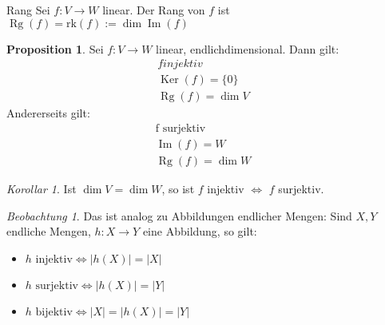 \documentclass[11pt]{article}
\DeclareMathOperator{\mdim}{dim}
\DeclareMathOperator{\mKer}{Ker}
\DeclareMathOperator{\mIm}{Im}
\DeclareMathOperator{\mRg}{Rg}
\theoremstyle{remark}
\newtheorem{beobachtung}{Beobachtung}
\theoremstyle{definition}
\newtheorem*{proposition}{Proposition}
\theoremstyle{remark}
\newtheorem*{korollar}{Korollar}
\begin{document}
\begin{definition}{Rang}{}
Sei $f:V\to W$ linear. Der Rang von \(f\) ist $\mRg(f) = \text{rk}(f) := \dim\mIm(f)$
\end{definition}

\begin{proposition} Sei \(f:V\to W\) linear, endlichdimensional.
Dann gilt:
\begin{align*}
	f injektiv &
	\\ \mKer(f) = \{0\}  &
	\\ \mRg(f) = \dim V &
\end{align*}
Andererseits gilt:
\begin{align*}
	\text{f surjektiv}
	\\ \mIm(f) = W  &
	\\ \mRg(f) = \dim W &
\end{align*}
\end{proposition}

\begin{korollar} Ist \(\mdim V = \mdim W \), so ist \(f\) injektiv $\iff $ \(f\) surjektiv.\end{korollar}
\begin{beobachtung}
	Das ist analog zu Abbildungen endlicher Mengen: Sind \(X,Y\) endliche Mengen, \(h: X\to Y\) eine Abbildung, so gilt:
	\begin{itemize}
		\item \(h\text{ injektiv} \iff |h(X)| = |X| \)
		\item \(h\text{ surjektiv} \iff |h(X)| = |Y| \)
		\item \(h\text{ bijektiv} \iff |X|=|h(X)|=|Y| \)
	\end{itemize}
\end{beobachtung}
\end{document}
